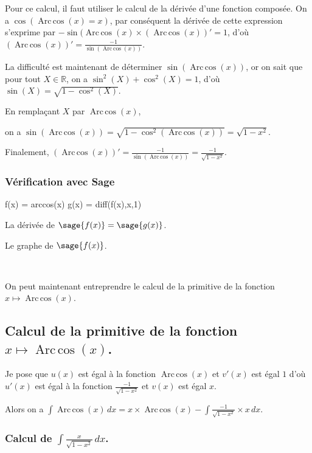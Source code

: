 \documentclass[a4paper,14pt]{extreport} %
\def\eclaire{\mathbb}
\def\R{\ensuremath{\eclaire R}}
\renewcommand{\arccos}{\mathop{\mathrm{Arc\,cos}}}
\begin{document}
Pour ce calcul, il faut utiliser le calcul de la dérivée d'une fonction composée. On a $\cos(\arccos(x)=x)$, par conséquent la dérivée de cette expression s'exprime par $ -\sin(\arccos(x) \times (\arccos(x))' = 1$, d'où $(\arccos(x))' = \frac{-1}{\sin(\arccos(x))} $.

La difficulté est maintenant de déterminer $\sin(\arccos(x))$, or on sait que pour tout $X \in \R$, on a $\sin^2(X) + \cos^2(X) = 1$, d'où $\sin(X) = \sqrt{1-\cos^2(X)}$.

En remplaçant $X$ par $\arccos(x)$, 

on a $\sin(\arccos(x)) = \sqrt{1-\cos^2(\arccos(x))} = \sqrt{1- x^2}$.

Finalement, $(\arccos(x))' = \frac{-1}{\sin(\arccos(x))} =  \frac{-1}{\sqrt{1- x^2}} $.

\subsubsection*{Vérification avec Sage}

\begin{sageblock}
    f(x) = arccos(x)
    g(x) = diff(f(x),x,1)
\end{sageblock}

La dérivée de $\sage{f(x)} = \sage{g(x)} $.

Le graphe de $\sage{f(x)} $.


\begin{center}
 \\
\end{center}


On peut maintenant entreprendre le calcul de la primitive de la  fonction  $x \mapsto \arccos(x) $.

\subsection{Calcul de la primitive de la fonction  $x \mapsto \arccos(x) $.}




Je pose que $u(x)$  est égal à la fonction $\arccos(x)$ et $v'(x)$ est égal $1$  d'où $u'(x)$  est égal à la fonction $ \frac{-1}{\sqrt{1- x^2}} $ et $v(x)$ est égal $x$.

Alors on a $\int \arccos(x) \, dx = x \times \arccos(x) -\int \frac{-1}{\sqrt{1- x^2}} \times x \, dx $.


\subsubsection*{Calcul de $\int \frac{x}{\sqrt{1- x^2}} \, dx $.}
\end{document}
